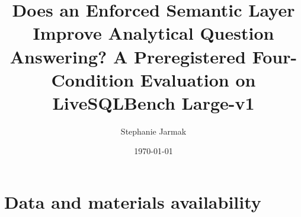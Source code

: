 \documentclass[11pt]{article}
\title{Does an Enforced Semantic Layer Improve Analytical Question
Answering? A Preregistered Four-Condition Evaluation on LiveSQLBench Large-v1}
\author{Stephanie Jarmak}
\date{\today}
\begin{document}
\maketitle

\begin{abstract}

\end{abstract}

\tableofcontents















\section{Data and materials availability}



\end{document}
